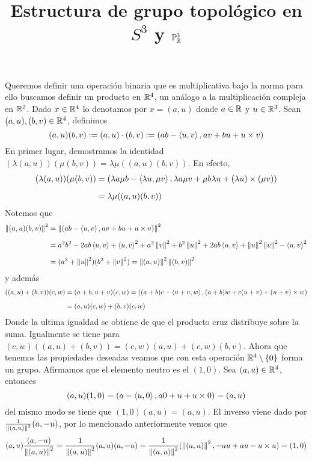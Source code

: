 \documentclass{article}
\title{Estructura de grupo topológico en $S^{3}$ y $\mathbb{P}^{3}_{\mathbb{R}}$}
\author{}
\date{}
\begin{document}
\maketitle

\noindent Queremos definir una operación binaria que es multiplicativa bajo la norma para ello 
buscamos definir un producto en $\mathbb{R}^{4}$, un análogo a la multiplicación compleja en $\mathbb{R}^{2}$. 
Dado $x\in\mathbb{R}^{4}$ lo denotamos por $x=(a,u)$ donde $a\in\mathbb{R}$ y $u\in\mathbb{R}^{3}$. Sean 
$(a,u),(b,v)\in\mathbb{R}^{4}$, definimos
\begin{equation*}
    (a,u)(b,v):=(a,u)\cdot(b,v):=(ab-\left\langle{u},{v}\right\rangle,av+bu+u\times v)
\end{equation*}
En primer lugar, demostramos la identidad $(\lambda(a,u))(\mu(b,v))=\lambda\mu((a,u)(b,v))$.
En efecto,
\begin{align*}
    (\lambda(a,u))(\mu(b,v)) &= (\lambda a\mu b-\left\langle{\lambda u},{\mu v}\right\rangle,\lambda a\mu v
    +\mu b\lambda u+(\lambda u)\times(\mu v)) \\[2mm]
    &= \lambda\mu((a,u)(b,v))
\end{align*}
Notemos que
\begin{align*}
    \left \lVert (a,u)(b,v)\right \rVert^{2} &= \left \lVert (ab-\left\langle{u},{v}\right\rangle,av+bu+u\times v)\right \rVert^{2} \\[2mm]
    &= a^{2}b^{2}-2ab\left\langle{u},{v}\right\rangle+\left\langle{u},{v}\right\rangle^{2}+a^{2}\left \lVert v\right \rVert^{2}+b^{2}\left \lVert u\right \rVert^{2}+2ab\left\langle{u},{v}\right\rangle
    +\left \lVert u\right \rVert^{2}\left \lVert v\right \rVert^{2}-\left\langle{u},{v}\right\rangle^{2} \\[2mm]
    &= (a^{2}+\left \lVert u\right \rVert^{2})(b^{2}+\left \lVert v\right \rVert^{2})=\left \lVert (a,u)\right \rVert^{2}\left \lVert (b,v)\right \rVert^{2}
\end{align*}
y además
\begin{align*}
    ((a,u)+(b,v))(c,w) &= (a+b,u+v)(c,w)=((a+b)c-\left\langle{u+v},{w}\right\rangle,(a+b)w+c(u+v)+(u+v)\times w) \\[2mm]
    &= (a,u)(c,w)+(b,v)(c,w)
\end{align*}
Donde la ultima igualdad se obtiene de que el producto cruz distribuye sobre la suma. Igualmente 
se tiene para $(c,w)((a,u)+(b,v))=(c,w)(a,u)+(c,w)(b,v)$. Ahora que tenemos las propiedades 
deseadas veamos que con esta operación $\mathbb{R}^{4}\setminus\{0\}$ forma un grupo. Afirmamos que el 
elemento neutro es el $(1,0)$. Sea
$(a,u)\in\mathbb{R}^{4}$, entonces
\begin{equation*}
    (a,u)(1,0)=(a-\left\langle{u},{0}\right\rangle,a0+u+u\times0)=(a,u)
\end{equation*}
del mismo modo se tiene que $(1,0)(a,u)=(a,u)$. El inverso viene dado por 
$\frac{1}{\left \lVert (a,u)\right \rVert^{2}}(a,-u)$, por lo mencionado anteriormente vemos que
\begin{equation*}
    (a,u)\frac{(a,-u)}{\left \lVert (a,u)\right \rVert^{2}}=\frac{1}{\left \lVert (a,u)\right \rVert^{2}}(a,u)(a,-u)
    =\frac{1}{\left \lVert (a,u)\right \rVert^{2}}(\left \lVert (a,u)\right \rVert^{2},-au+au-u\times u)=(1,0)
\end{equation*}
\end{document}

